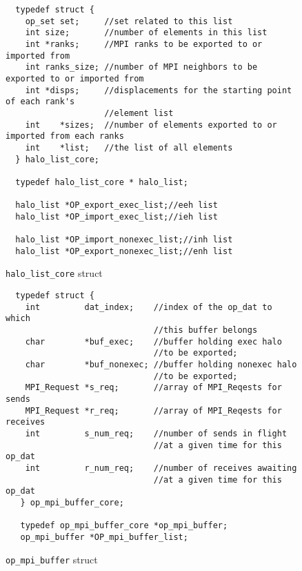 \documentclass[11pt]{article}
\begin{document}
\begin{figure}[h]\small
\begin{verbatim}
  typedef struct {
    op_set set;     //set related to this list
    int size;       //number of elements in this list
    int *ranks;     //MPI ranks to be exported to or imported from
    int ranks_size; //number of MPI neighbors to be exported to or imported from
    int *disps;     //displacements for the starting point of each rank's
                    //element list
    int    *sizes;  //number of elements exported to or imported from each ranks
    int    *list;   //the list of all elements
  } halo_list_core;

  typedef halo_list_core * halo_list;

  halo_list *OP_export_exec_list;//eeh list
  halo_list *OP_import_exec_list;//ieh list

  halo_list *OP_import_nonexec_list;//inh list
  halo_list *OP_export_nonexec_list;//enh list
\end{verbatim}
\vspace{-20pt}
\caption{\small \texttt{halo\_list\_core} struct}\vspace{-5pt}\label{fig:haloliststruct}
\end{figure}\normalsize



\begin{figure}[h]\small
\begin{verbatim}
  typedef struct {
    int         dat_index;    //index of the op_dat to which
                              //this buffer belongs
    char        *buf_exec;    //buffer holding exec halo
                              //to be exported;
    char        *buf_nonexec; //buffer holding nonexec halo
                              //to be exported;
    MPI_Request *s_req;       //array of MPI_Reqests for sends
    MPI_Request *r_req;       //array of MPI_Reqests for receives
    int         s_num_req;    //number of sends in flight
                              //at a given time for this op_dat
    int         r_num_req;    //number of receives awaiting
                              //at a given time for this op_dat
   } op_mpi_buffer_core;
   
   typedef op_mpi_buffer_core *op_mpi_buffer;
   op_mpi_buffer *OP_mpi_buffer_list;
\end{verbatim}
\caption{\small \texttt{op\_mpi\_buffer} struct}
\normalsize\vspace{-0pt}\label{fig:mpisendbufstruct}
\end{figure}
\end{document}
